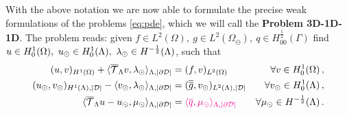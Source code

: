 \documentclass[r]{siamart171218}
\newcommand{\kent}[1]{{\color{red}#1}}
\newcommand{\paolo}[1]{{\color{magenta}#1}}
\begin{document}

\kent{With the above notation we are now able to formulate the precise weak formulations of the problems \eqref{eq:pde}, which we will call the \textbf{Problem 3D-1D-1D}. The problem} reads:
\paolo{given $f\in L^2(\Omega), \ g \in L^2(\Omega_{\ominus}), \ q \in H^\frac12_{00}(\Gamma)$}
find $u \in H^1_0(\Omega),\ u_{\odot} \in H^1_0(\Lambda), \ \lambda_{\odot} \in H^{-\frac 1 2}(\Lambda)$, such that
\begin{subequations}\label{eq:problem2}
\begin{align}
\label{eq:problem2a}
(u,v)_{H^1(\Omega)} 
+  \langle \mtrace v, \ld \rangle_{\Lambda, |\DD|} &= 
(f,v)_{L^2(\Omega)} &\forall v \in H^1_0(\Omega)\, ,
\\
\label{eq:problem2b}
(\ud,\vd)_{H^1(\Lambda),|\D|} - \langle  \vd, \ld \rangle_{\Lambda, |\DD|} 
&=  (\avrd{g},\vd)_{L^2(\Lambda),|\D|}
&\forall \vd \in H^1_0(\Lambda)\, ,
\\
\label{eq:problem2c}
\langle \mtrace u -   \ud, \md \rangle_{\Lambda,|\DD|} 
&= \paolo{\langle \avrc{q},\md\rangle_{\Lambda,|\DD|}}
&\forall \md \in H^{-\frac 1 2}(\Lambda)\,.
\end{align}
\end{subequations}
\end{document}
